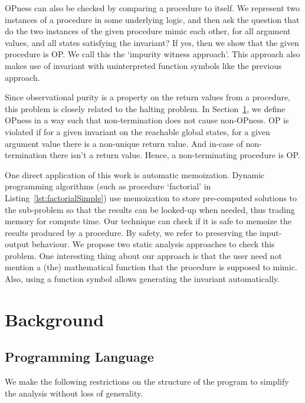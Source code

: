 \documentclass{llncs}
\begin{document}
OPness can also be checked by comparing a procedure to itself. We
represent two instances of a procedure in some underlying logic, and
then ask the question that do the two instances of the given procedure
mimic each other, for all argument values, and all states satisfying
the invariant? If yes, then we show that the given procedure is OP. We
call this the `impurity witness approach'.  This approach also makes
use of invariant with uninterpreted function symbols like the previous
approach.

Since observational purity is a property on the return values from a
procedure, this problem is closely related to the halting problem. In
Section~\ref{sec:background}, we define OPness in a way such that
non-termination does not cause non-OPness. OP is violated if for a
given invariant on the reachable global states, for a given argument
value there is a non-unique return value. And in-case of
non-termination there isn't a return value. Hence, a non-terminating
procedure is OP.

One direct application of this work is automatic memoization. Dynamic
programming algorithms (such as procedure `factorial' in
Listing~\ref{lst:factorialSimple}) use memoization to store
pre-computed solutions to the sub-problem so that the results can be
looked-up when needed, thus trading memory for compute time. Our
technique can check if it is safe to memoize the results produced by a
procedure. By safety, we refer to preserving the input-output
behaviour. We propose two static analysis approaches to check this
problem. One interesting thing about our approach is that the user
need not mention a (the) mathematical function that the procedure is
supposed to mimic. Also, using a function symbol allows generating the
invariant automatically.

\section{Background} \label{sec:background}

\subsection{Programming Language}
We make the following restrictions on the structure of the program to
simplify the analysis without loss of generality.
\end{document}
